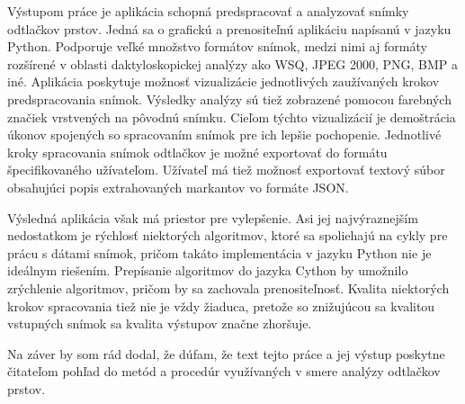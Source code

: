   Výstupom práce je aplikácia schopná predspracovať a analyzovať snímky odtlačkov prstov. Jedná sa o grafickú a prenositeľnú aplikáciu napísanú v jazyku
  Python. Podporuje veľké množstvo formátov snímok, medzi nimi aj formáty rozšírené v oblasti daktyloskopickej analýzy ako WSQ, JPEG 2000, PNG, BMP a iné.
  Aplikácia poskytuje možnosť vizualizácie jednotlivých zaužívaných krokov predspracovania snímok. Výsledky analýzy sú tiež zobrazené pomocou farebných
  značiek vrstvených na pôvodnú snímku. Cieľom týchto vizualizácií je demoštrácia úkonov spojených so spracovaním snímok pre ich lepšie pochopenie.
  Jednotlivé kroky spracovania snímok odtlačkov je možné exportovať do formátu špecifikovaného užívateľom.
  Užívateľ má tiež možnosť exportovať textový súbor obsahujúci popis extrahovaných markantov vo formáte JSON.

  Výsledná aplikácia však má priestor pre vylepšenie. Asi jej najvýraznejším nedostatkom je rýchlosť niektorých algoritmov, ktoré sa spoliehajú na
  cykly pre prácu s dátami snímok, pričom takáto implementácia v jazyku Python nie je ideálnym riešením. Prepísanie algoritmov do jazyka Cython by umožnilo
  zrýchlenie algoritmov, pričom by sa zachovala prenositeľnosť. Kvalita niektorých krokov spracovania tiež nie je vždy žiaduca, pretože so znižujúcou sa kvalitou
  vstupných snímok sa kvalita výstupov značne zhoršuje.

  Na záver by som rád dodal, že dúfam, že text tejto práce a jej výstup poskytne čitateľom pohľad do metód a procedúr využívaných v smere analýzy odtlačkov
  prstov.

